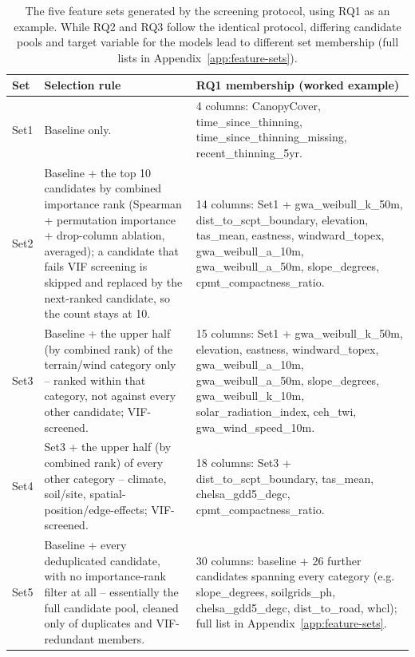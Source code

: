 \begin{table}[!htbp]
\centering
\scriptsize
\renewcommand{\arraystretch}{1.2}
\begin{tabular}{p{1cm}p{5.3cm}p{7.2cm}}
\toprule
Set & Selection rule & RQ1 membership (worked example) \\
\midrule
Set1 & Baseline only. & 4 columns: CanopyCover, time\_since\_thinning,
time\_since\_thinning\_missing, recent\_thinning\_5yr. \\
Set2 & Baseline + the top 10 candidates by combined importance rank (Spearman + permutation
importance + drop-column ablation, averaged); a candidate that fails VIF screening is skipped and
replaced by the next-ranked candidate, so the count stays at 10. & 14 columns: Set1 +
gwa\_weibull\_k\_50m, dist\_to\_scpt\_boundary, elevation, tas\_mean, eastness, windward\_topex,
gwa\_weibull\_a\_10m, gwa\_weibull\_a\_50m, slope\_degrees, cpmt\_compactness\_ratio. \\
Set3 & Baseline + the upper half (by combined rank) of the terrain/wind category only -- ranked
within that category, not against every other candidate; VIF-screened. & 15 columns: Set1 +
gwa\_weibull\_k\_50m, elevation, eastness, windward\_topex, gwa\_weibull\_a\_10m,
gwa\_weibull\_a\_50m, slope\_degrees, gwa\_weibull\_k\_10m, solar\_radiation\_index, ceh\_twi,
gwa\_wind\_speed\_10m. \\
Set4 & Set3 + the upper half (by combined rank) of every other category -- climate, soil/site,
spatial-position/edge-effects; VIF-screened. & 18 columns: Set3 + dist\_to\_scpt\_boundary,
tas\_mean, chelsa\_gdd5\_degc, cpmt\_compactness\_ratio. \\
Set5 & Baseline + every deduplicated candidate, with no importance-rank filter at all --
essentially the full candidate pool, cleaned only of duplicates and VIF-redundant members. & 30
columns: baseline + 26 further candidates spanning every category (e.g. slope\_degrees,
soilgrids\_ph, chelsa\_gdd5\_degc, dist\_to\_road, whcl); full list in
Appendix~\ref{app:feature-sets}. \\
\bottomrule
\end{tabular}
\caption{The five feature sets created by applying the screening steps above, here is the worked example for RQ1.
RQ2 and RQ3 apply the identical steps over their own candidate pools (different available variables,
different target column), therefore different final membership at each Set -- full membership
for all three research questions is given in Appendix~\ref{app:feature-sets}.}

\caption{The five feature sets generated by the screening protocol, using RQ1 as an example. While RQ2 and RQ3 follow the identical protocol, differing candidate pools and target variable for the models lead to different set membership (full lists in Appendix~\ref{app:feature-sets}).}
\label{tab:feature-sets-composition-rq1}
\end{table}

